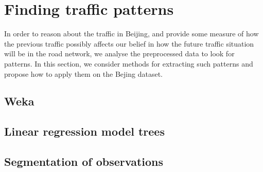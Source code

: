 \section{Finding traffic patterns}
In order to reason about the traffic in Beijing, and provide some measure of how the previous traffic possibly affects our belief in how the future traffic situation will be in the road network, we analyse the preprocessed data to look for patterns. In this section, we consider methods for extracting such patterns and propose how to apply them on the Bejing dataset.

\subsection{Weka}\label{patterns:weka}
\subsection{Linear regression model trees}\label{patterns:model-trees}
\subsection{Segmentation of observations}\label{patterns:segmentation}
